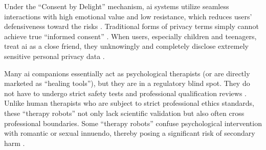 Under the ``Consent by Delight'' mechanism, \gls{ai} systems utilize seamless interactions with high emotional value and low resistance, which reduces users' defensiveness toward the risks \cite[p.~1, 5]{lee_consent_2025}. Traditional forms of privacy terms simply cannot achieve true ``informed consent'' \cite[p.~2]{lee_consent_2025}. When users, especially children and teenagers, treat \gls{ai} as a close friend, they unknowingly and completely disclose extremely sensitive personal privacy data \cite[p.~6]{kurian_no_2024} \cite[p.~4]{kurian_designing_2025}.


Many \gls{ai} companions essentially act as psychological therapists (or are directly marketed as ``healing tools''), but they are in a regulatory blind spot. They do not have to undergo strict safety tests and professional qualification reviews \cite[p.~82]{branch_ai_2025}. Unlike human therapists who are subject to strict professional ethics standards, these ``therapy robots'' not only lack scientific validation but also often cross professional boundaries. Some ``therapy robots'' confuse psychological intervention with romantic or sexual innuendo, thereby posing a significant risk of secondary harm \cite[p.~50]{huntington_ai_2025}.


